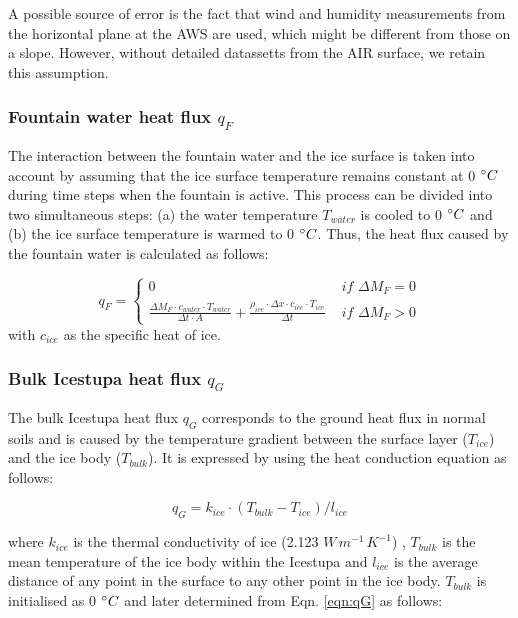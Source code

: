 \documentclass[utf8]{frontiersSCNS} %
\begin{document}
A possible source of error is the fact that wind and humidity measurements from the horizontal plane at the AWS are
used, which might be different from those on a slope. However, without detailed datassetts from the AIR surface, we
retain this assumption.

\subsubsection{Fountain water heat flux \texorpdfstring{$q_{F}$}{Lg} }

The interaction between the fountain water and the ice surface is taken into account by assuming that the ice surface
temperature remains constant at 0 $\degree C$ during time steps when the fountain is active. This process can be divided
into two simultaneous steps: (a) the water temperature $T_{water}$ is cooled to 0 $\degree C$ and (b) the ice surface
temperature is warmed to 0 $\degree C$. Thus, the heat flux caused by the fountain water is calculated as follows:

\begin{equation} 
  q_{F} = \left\{ \begin{array}{ll}
         0 & \textit{ if } \Delta M_{F} = 0\\ \frac{ \Delta M_F \cdot c_{water} \cdot T_{water}}{\Delta t \cdot A} +
         \frac{\rho_{ice} \cdot \Delta x \cdot c_{ice} \cdot T_{ice}}{\Delta t} & \textit{ if } \Delta M_{F} > 0 
    \end{array} \right.  \label{eqn:qF}
\end{equation} 
with $c_{ice}$ as the specific heat of ice. 

\subsubsection{Bulk Icestupa heat flux \texorpdfstring{$q_{G}$}{Lg}} \label{sec:Bulkflux}
The bulk Icestupa heat flux $q_{G}$ corresponds to the ground heat flux in normal soils and is caused by the temperature
gradient between the surface layer ($T_{ice}$) and the ice body ($T_{bulk}$). It is expressed by using the heat
conduction equation as follows:

\begin{equation} q_{G} = k_{ice} \cdot (T_{bulk}-T_{ice})/l_{ice} \label{eqn:qG}    \end{equation}

where $k_{ice}$ is the thermal conductivity of ice (2.123 $W\, m^{-1}\,K^{-1}$) , $T_{bulk}$ is the mean temperature of
the ice body within the Icestupa and $l_{ice}$ is the average distance of any point in the surface to any other point in
the ice body. $T_{bulk}$ is initialised as 0 $\degree C$ and later determined from Eqn. \ref{eqn:qG} as follows:
\end{document}

